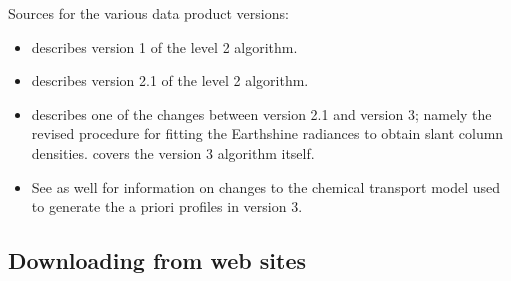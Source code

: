 \documentclass[12pt]{article}
\begin{document}
	Sources for the various data product versions:
	\begin{itemize}
	\item \citet{bucsela06} describes version 1 of the level 2 algorithm.
	\item \citet{bucsela13} describes version 2.1 of the level 2 algorithm.
	\item \citet{marchenko15} describes one of the changes between version 2.1 and version 3; namely the revised procedure for fitting the Earthshine radiances to obtain slant column densities. \citet{krotkov17} covers the version 3 algorithm itself.
	\item See \citet{omi-readme} as well for information on changes to the chemical transport model used to generate the  a priori profiles in version 3.
	\end{itemize}
	
	\subsection{Downloading from web sites}
	
\end{document}
